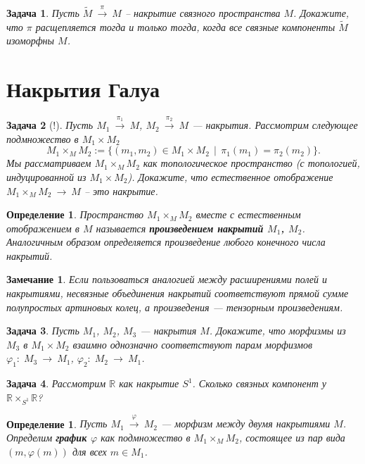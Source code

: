 \documentclass[12pt]{book}
\newcommand{\subs}{\section}
\newcommand{\arrow}{{\:\longrightarrow\:}}
\renewcommand{\phi}{\varphi}
\def\R{{\mathbb R}}
\theoremstyle{upshape}
\newtheorem{zadacha}{Задача}[chapter]
\theoremstyle{generic}
\newtheorem{opredelenie}[teorema]{Определение}
\theoremstyle{upshapenonumber}
\newtheorem{zamechanie}{Замечание}[chapter]
\newcommand{\следствие}{%
     \refstepcounter{teorema}
     {\noindent\bf Следствие \thechapter.\arabic{teorema}:\ }}
\newcommand{\пример}{%
     \refstepcounter{teorema}
     {\noindent\bf Пример \thechapter.\arabic{teorema}:\ }}
\newcommand{\лемма}{%
     \refstepcounter{teorema}
     {\noindent\bf Лемма \thechapter.\arabic{teorema}:\ }}
\newcommand{\теорема}{%
     \refstepcounter{teorema}
     {\noindent\bf Теорема \thechapter.\arabic{teorema}:\ }}
\newcommand{\утверждение}{%
     \refstepcounter{teorema}
     {\noindent\bf Утверждение \thechapter.\arabic{teorema}:\ }}
\begin{document}
{\begin{zadacha}
Пусть  $\tilde M \stackrel \pi \arrow M$ --
накрытие связного пространства $M$. Докажите, что
$\pi$ расщепляется тогда и только тогда, когда
все связные компоненты $\tilde M$ изоморфны $M$.
\end{zadacha}


\subs{Накрытия Галуа}

\begin{zadacha}[!]
Пусть $M_1 \stackrel {\pi_1} \arrow M$,
$M_2 \stackrel {\pi_2} \arrow M$ --- накрытия.
Рассмотрим следующее подмножество в $M_1\times M_2$
\[ M_1\times_M M_2:= 
\{ (m_1, m_2)\in M_1\times M_2 \ \ | \ \ \pi_1(m_1)= \pi_2(m_2)\}.
\]
Мы рассматриваем $M_1\times_M M_2$ как топологическое
пространство (с топологией, индуцированной из $M_1\times M_2$).
Докажите, что естественное отображение 
$M_1\times_M M_2\arrow M$ --
это накрытие.
\end{zadacha}

\begin{opredelenie}
Пространство $M_1\times_M M_2$ вместе с естественным отображением
в $M$ называется {\bf произведением
накрытий $M_1$, $M_2$}. Аналогичным образом 
определяется произведение любого конечного числа накрытий.
\end{opredelenie}

\begin{zamechanie}
Если пользоваться аналогией между расширениями
полей и накрытиями, несвязные объединения накрытий
соответствуют прямой сумме полупростых
артиновых колец, а произведения --- 
тензорным произведениям.
\end{zamechanie}

\begin{zadacha} 
Пусть $M_1$, $M_2$, $M_3$ --- накрытия $M$. Докажите, что
морфизмы из $M_3$ в $M_1\times M_2$
взаимно однозначно соответствуют
парам морфизмов  $\phi_1:\; M_3\arrow M_1$, 
$\phi_2:\; M_2\arrow M_1$.
\end{zadacha}

\begin{zadacha}
Рассмотрим $\R$ как накрытие $S^1$.
Сколько связных компонент у $\R\times_{S^1}\R$?
\end{zadacha}

\begin{opredelenie}
Пусть $M_1\stackrel\phi\arrow M_2$ --- морфизм между двумя накрытиями $M$.
Определим {\bf график $\phi$}
как подмножество в $M_1\times_M M_2$,
состоящее из пар вида $(m, \phi(m))$
для всех $m\in M_1$.
\end{opredelenie}

}
\end{document}
